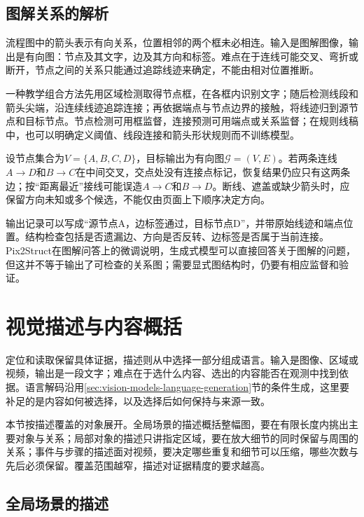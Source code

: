 \subsection{图解关系的解析}
\label{sec:vision-understanding-diagrams}
\label{sec:vision-understanding-diagram-graph}

流程图中的箭头表示有向关系，位置相邻的两个框未必相连。输入是图解图像，输出是有向图：节点及其文字，边及其方向和标签。难点在于连线可能交叉、弯折或断开，节点之间的关系只能通过追踪线迹来确定，不能由相对位置推断。

一种教学组合方法先用区域检测取得节点框，在各框内识别文字；随后检测线段和箭头尖端，沿连续线迹追踪连接；再依据端点与节点边界的接触，将线迹归到源节点和目标节点。节点检测可用框监督，连接预测可用端点或关系监督；在规则线稿中，也可以明确定义阈值、线段连接和箭头形状规则而不训练模型。

设节点集合为$V=\{A,B,C,D\}$，目标输出为有向图$\mathcal G=(V,E)$。若两条连线$A\to D$和$B\to C$在中间交叉，交点处没有连接点标记，恢复结果仍应只有这两条边；按“距离最近”接线可能误造$A\to C$和$B\to D$。断线、遮盖或缺少箭头时，应保留方向未知或多个候选，不能仅由页面上下顺序决定方向。

输出记录可以写成“源节点A，边标签通过，目标节点D”，并带原始线迹和端点位置。结构检查包括是否遗漏边、方向是否反转、边标签是否属于当前连接。Pix2Struct在图解问答上的微调说明，生成式模型可以直接回答关于图解的问题，但这并不等于输出了可检查的关系图；需要显式图结构时，仍要有相应监督和验证。

\section{视觉描述与内容概括}
\label{sec:vision-understanding-description}

定位和读取保留具体证据，描述则从中选择一部分组成语言。输入是图像、区域或视频，输出是一段文字；难点在于选什么内容、选出的内容能否在观测中找到依据。语言解码沿用\ref{sec:vision-models-language-generation}节的条件生成，这里要补足的是内容如何被选择，以及选择后如何保持与来源一致。

本节按描述覆盖的对象展开。全局场景的描述概括整幅图，要在有限长度内挑出主要对象与关系；局部对象的描述只讲指定区域，要在放大细节的同时保留与周围的关系；事件与步骤的描述面对视频，要决定哪些重复和细节可以压缩，哪些次数与先后必须保留。覆盖范围越窄，描述对证据精度的要求越高。

\subsection{全局场景的描述}
\label{sec:vision-understanding-global-caption}

